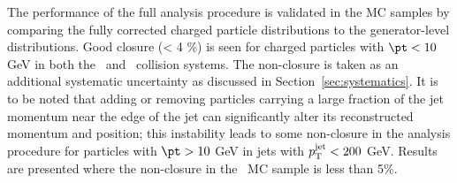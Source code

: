 The performance of the full analysis procedure is validated in the MC samples by comparing the fully corrected charged particle distributions to the generator-level distributions. Good closure (< 4 \%) is seen for charged particles with $\pt < 10$ GeV in both the \pp\ and \pbpb\ collision systems. The non-closure is taken as an additional systematic uncertainty as discussed in Section~\ref{sec:systematics}.
It is to be noted that adding or removing particles carrying a large fraction of the jet momentum near the edge of the jet can significantly alter its
reconstructed momentum and position; this instability leads to some non-closure in the analysis procedure for particles with $\pt > 10$ GeV in jets with $\mbox{$p_{\mathrm{T}}^{\mathrm{jet}}$} < 200$ GeV. 
Results are presented where the non-closure in the \pp\ MC sample is less than 5\%.




